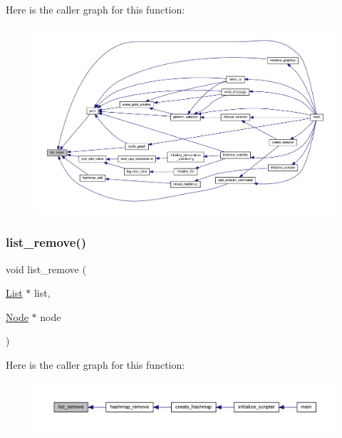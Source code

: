 Here is the caller graph for this function\+:
\nopagebreak
\begin{figure}[H]
\begin{center}
\leavevmode
\includegraphics[width=350pt]{linked-list_8h_a947069a28d8173531d9186a74e82fb62_icgraph}
\end{center}
\end{figure}
\mbox{\label{linked-list_8h_ad17dd6e2d3e64d3e9665f313ffb808a1}} 
\subsubsection{\texorpdfstring{list\+\_\+remove()}{list\_remove()}}
{\footnotesize\ttfamily void list\+\_\+remove (\begin{DoxyParamCaption}\item[{\hyperlink{structList}{List} $\ast$}]{list,  }\item[{\hyperlink{structNode}{Node} $\ast$}]{node }\end{DoxyParamCaption})}

Here is the caller graph for this function\+:
\nopagebreak
\begin{figure}[H]
\begin{center}
\leavevmode
\includegraphics[width=350pt]{linked-list_8h_ad17dd6e2d3e64d3e9665f313ffb808a1_icgraph}
\end{center}
\end{figure}
